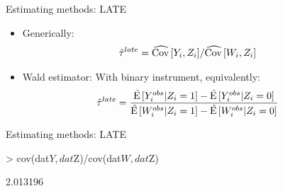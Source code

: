 \documentclass[xcolor={dvipsnames},handout]{beamer}
\begin{document}

\begin{frame}[fragile]{Estimating methods: LATE}

\begin{itemize}
\item Generically:
\begin{align*}
\hat \tau^{late} & = \widehat {{\textrm{Cov} }\,}[Y_i, Z_i] / \widehat {{\textrm{Cov} }\,}[W_i, Z_i]
\end{align*}
\item Wald estimator: With binary instrument, equivalently:
\begin{align*}
\hat \tau^{late}
            & = \frac{\hat {{\textrm E}\,}[Y_i^{obs} | Z_i = 1] - \hat{{\textrm E}\,}[Y_i^{obs} | Z_i = 0]}{\hat{{\textrm E}\,}[W_i^{obs} | Z_i = 1] - \hat{{\textrm E}\,}[W_i^{obs} | Z_i = 0]}
\end{align*}
\end{itemize}




\end{frame}



\begin{frame}[fragile]{Estimating methods: LATE}

\small

\begin{Schunk}
\begin{Sinput}
> cov(dat$Y, dat$Z)/cov(dat$W, dat$Z)
\end{Sinput}
\begin{Soutput}
[1] 2.013196
\end{Soutput}
\end{Schunk}
\end{frame}
\end{document}

